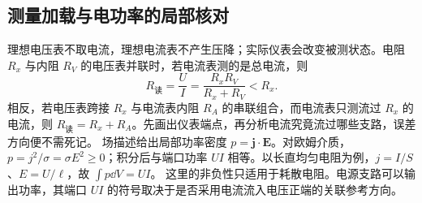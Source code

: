 \subsection{测量加载与电功率的局部核对}
理想电压表不取电流，理想电流表不产生压降；实际仪表会改变被测状态。电阻 $R_x$ 与内阻 $R_V$ 的电压表并联时，若电流表测的是总电流，则
\[
 R_{\text{读}}=\frac UI=\frac{R_xR_V}{R_x+R_V}<R_x.
\]
相反，若电压表跨接 $R_x$ 与电流表内阻 $R_A$ 的串联组合，而电流表只测流过 $R_x$ 的电流，则 $R_{\text{读}}=R_x+R_A$。先画出仪表端点，再分析电流究竟流过哪些支路，误差方向便不需死记。
场描述给出局部功率密度 $p=\boldsymbol j\cdot\boldsymbol E$。对欧姆介质，$p=j^2/\sigma=\sigma E^2\ge0$；积分后与端口功率 $UI$ 相等。以长直均匀电阻为例，$j=I/S$、$E=U/\ell$，故 $\int p\dd V=UI$。
这里的非负性只适用于耗散电阻。电源支路可以输出功率，其端口 $UI$ 的符号取决于是否采用电流流入电压正端的关联参考方向。

